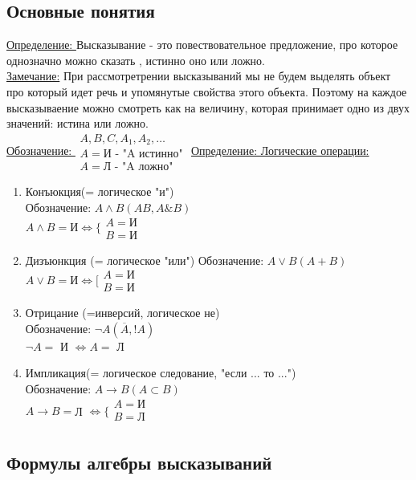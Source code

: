 \documentclass[12pt]{article}
\begin{document}
    \subsection{Основные понятия}
    \underline{Определение: } Высказывание - это повествовательное предложение, про которое однозначно можно сказать
    , истинно оно или ложно.\\
    \underline{Замечание:} При рассмотретрении высказываний мы не будем выделять объект про который идет
    речь и упомянутые свойства этого объекта.
    Поэтому на каждое высказываение можно смотреть как на величину, которая принимает одно из двух значений:
    истина или ложно.\\
    \underline{Обозначение: } $\begin{matrix}
        A,B,C,A_1,A_2,\dots\\
        A=\text{И - "A истинно"}\\
        A=\text{Л - "A ложно"}
    \end{matrix}$
    \underline{Определение: Логические операции:}
    \begin{enumerate}
        \item Конъюкция(= логическое "и")\\
        Обозначение: $A \land B (AB,A \& B)$\\
        $A \land B = \text{И} \Leftrightarrow \Bigg\{ \begin{matrix}
            A=\text{И}\\
            B=\text{И}
        \end{matrix}$
        \item Дизъюнкция (= логическое "или")
        Обозначение: $A \lor B (A+B)$\\
        $A \lor B = \text{И} \Leftrightarrow \Bigg[ \begin{matrix}
            A=\text{И}\\
            B=\text{И}
        \end{matrix}$
        \item Отрицание (=инверсий, логическое не)\\
        Обозначение: $\lnot A (\overline{A},!A)$\\
        $\lnot A = $ И $\Leftrightarrow A=$ Л
        \item Импликация(= логическое следование, "если ... то ...")\\
        Обозначение: $A \rightarrow B (A\subset B)$\\
        $A \rightarrow B=$Л $\Leftrightarrow \Bigg\{ \begin{matrix}
            A=\text{И}\\
            B=\text{Л}\\
        \end{matrix}$
    \end{enumerate} 
    \subsection{Формулы алгебры высказываний}
\end{document}
